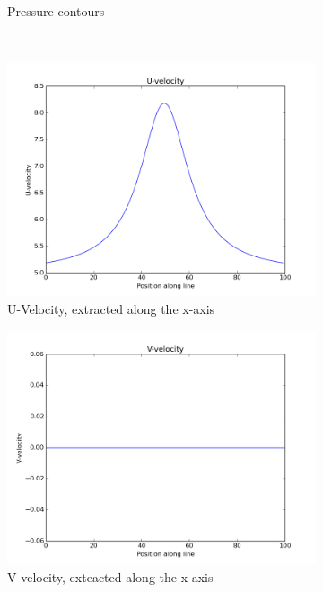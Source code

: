 \documentclass[10pt,a4paper]{article}
\begin{document}
\begin{figure}
\begin{subfigure}{0.48\textwidth}
  \caption{Pressure contours}
\end{subfigure} \\
\centering
\begin{subfigure}{0.48\textwidth}
    \includegraphics[width=1.0\textwidth]{Figures/Vortex_wall_U}
  \caption{U-Velocity, extracted along the x-axis}
\end{subfigure}
\hfill
\begin{subfigure}{0.48\textwidth}
    \includegraphics[width=1.0\textwidth]{Figures/Vortex_wall_V}
  \caption{V-velocity, exteacted along the x-axis}
\end{subfigure} \\
\centering
\begin{subfigure}{0.48\textwidth}

\end{subfigure}
\end{figure}
\end{document}
